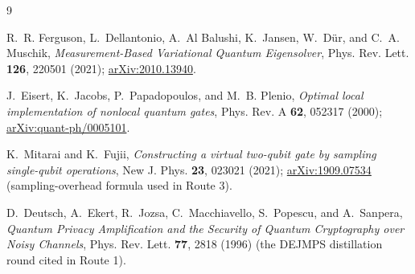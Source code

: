 \documentclass[11pt]{article}
\begin{document}
\begin{thebibliography}{9}

R.~R. Ferguson, L.~Dellantonio, A.~Al Balushi, K.~Jansen, W.~D\"ur, and
C.~A. Muschik,
\emph{Measurement-Based Variational Quantum Eigensolver},
Phys. Rev. Lett. \textbf{126}, 220501 (2021);
\href{https://arxiv.org/abs/2010.13940}{arXiv:2010.13940}.

J.~Eisert, K.~Jacobs, P.~Papadopoulos, and M.~B. Plenio,
\emph{Optimal local implementation of nonlocal quantum gates},
Phys. Rev. A \textbf{62}, 052317 (2000);
\href{https://arxiv.org/abs/quant-ph/0005101}{arXiv:quant-ph/0005101}.

K.~Mitarai and K.~Fujii,
\emph{Constructing a virtual two-qubit gate by sampling single-qubit
operations},
New J. Phys. \textbf{23}, 023021 (2021);
\href{https://arxiv.org/abs/1909.07534}{arXiv:1909.07534}
(sampling-overhead formula used in Route 3).

D.~Deutsch, A.~Ekert, R.~Jozsa, C.~Macchiavello, S.~Popescu, and
A.~Sanpera,
\emph{Quantum Privacy Amplification and the Security of Quantum Cryptography
over Noisy Channels},
Phys. Rev. Lett. \textbf{77}, 2818 (1996)
(the DEJMPS distillation round cited in Route 1).

\end{thebibliography}
\end{document}
